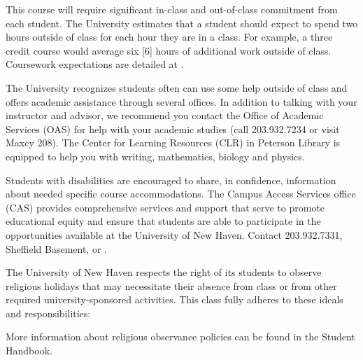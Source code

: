 This course will require significant in-class and out-of-class commitment from
each student.
The University estimates that a student should expect to spend two hours
outside of class for each hour they are in a class.
For example, a three credit course would average six [6] hours of additional
work outside of class.
Coursework expectations are detailed at
\Urls{\CourseworkURL}.


The University recognizes students often can use some help outside of class
and offers academic assistance through several offices.
In addition to talking with your instructor and advisor, we recommend you
contact the Office of Academic Services (OAS) for help with your academic
studies (call 203.932.7234 or visit Maxcy 208).
The Center for Learning Resources (CLR) in Peterson Library is equipped to help
you with writing, mathematics, biology and physics.  

Students with disabilities are encouraged to share, in confidence, information
about needed specific course accommodations.
The Campus Access Services office (CAS) provides comprehensive services
and support that serve to promote educational equity and ensure that students
are able to participate in the opportunities available at the University
of New Haven.
Contact 203.932.7331, Sheffield Basement, or
\Urls{\AccessURL}.


The University of New Haven respects the right of its students to observe
religious holidays that may necessitate their absence from class or from
other required university-sponsored activities.
This class fully adheres to these ideals and responsibilities:
\vspace*{0.2em}


\vspace*{1.0em}
\noindent
More information about religious observance policies can be found in the
Student Handbook.
